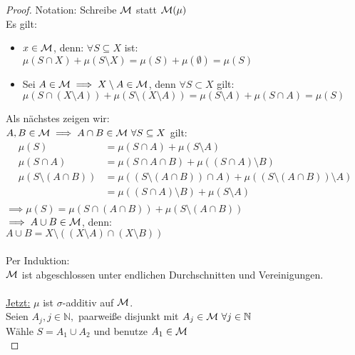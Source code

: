 \documentclass[11pt,a4paper,fleqn,openany]{report}
\begin{document}
    \begin{proof}
      Notation: Schreibe $\mathcal{M}$ statt $\mathcal{M}(\mu)$\\
      Es gilt:
      \begin{itemize}
        \item $x \in \mathcal{M}$, denn: $\forall S \subseteq X$ ist:\\
              $\mu(S \cap X) + \mu(S \setminus X) = \mu(S) + \mu(\emptyset) = \mu(S)$
        \item Sei $A \in \mathcal{M} \implies X \setminus A \in \mathcal{M}$, denn $\forall S \subset X$ gilt:\\
              $\mu(S \cap (X \setminus A)) + \mu(S \setminus (X \setminus A)) = \mu(S \setminus A) + \mu(S \cap A) = \mu(S)$
      \end{itemize}
      Als nächstes zeigen wir:\\
      $A,B \in \mathcal{M} \implies A \cap B \in \mathcal{M} \ \forall S \subseteq X$ gilt:
      \begin{align*}
        \mu(S) 
        &= \mu(S \cap A) + \mu(S \setminus A)\\
        \mu(S \cap A) 
        &= \mu(S \cap A \cap B) + \mu((S \cap A) \setminus B)\\
        \mu(S \setminus (A \cap B)) 
        &= \mu((S \setminus (A \cap B)) \cap A) + \mu((S \setminus (A \cap B)) \setminus A)\\
        &= \mu((S \cap A) \setminus B) + \mu(S \setminus A)\\
      \end{align*}
      $\implies \mu(S) = \mu(S \cap (A \cap B)) + \mu(S \setminus (A \cap B))$\\
      $\implies A \cup B \in \mathcal{M}$, denn:\\
      $A \cup B = X \setminus ((X \setminus A) \cap (X \setminus B))$\\ \\
      Per Induktion:\\
      $\mathcal{M}$ ist abgeschlossen unter endlichen Durchschnitten und Vereinigungen.\\ \\
      \underline{Jetzt:} $\mu$ ist $\sigma$-additiv auf $\mathcal{M}$.\\
      Seien $A_j, j \in \mathbb{N},$ paarweiße disjunkt mit $A_j \in \script{M} \ \forall j \in \mathbb{N}$\\
      Wähle $S = A_1 \cup A_2$ und benutze $A_1 \in \mathcal{M}$\\

\end{proof}
\end{document}
